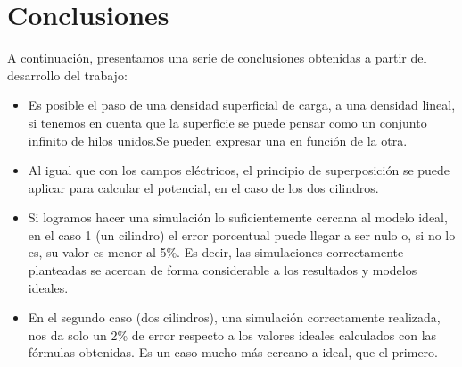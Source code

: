 \documentclass{article}
\begin{document}
\section{Conclusiones}

A continuación, presentamos una serie de conclusiones obtenidas a partir del desarrollo del trabajo:
\begin{itemize}
		\item Es posible el paso de una densidad superficial de carga, a una densidad lineal, si tenemos en cuenta que la superficie se puede pensar como un conjunto infinito de hilos unidos.Se pueden expresar una en función de la otra.
		\item Al igual que con los campos eléctricos, el principio de superposición se puede aplicar para calcular el potencial, en el caso de los dos cilindros.
		\item Si logramos hacer una simulación lo suficientemente cercana al modelo ideal, en el caso 1 (un cilindro) el error porcentual puede llegar a ser nulo o, si no lo es, su valor es menor al 5\%. Es decir, las simulaciones correctamente planteadas se acercan de forma considerable a los resultados y modelos ideales.
        \item En el segundo caso (dos cilindros), una simulación correctamente realizada, nos da solo un 2\% de error respecto a los valores ideales calculados con las fórmulas obtenidas. Es un caso mucho más cercano a ideal, que el primero.
        

	\end{itemize}
\end{document}
